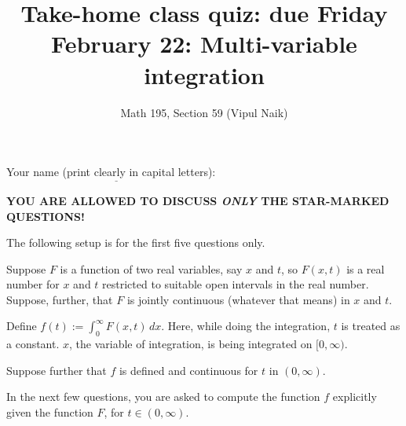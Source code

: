 \documentclass[10pt]{amsart}
\title{Take-home class quiz: due Friday February 22: Multi-variable integration}
\author{Math 195, Section 59 (Vipul Naik)}
\begin{document}
\maketitle

Your name (print clearly in capital letters): $\underline{\qquad\qquad\qquad\qquad\qquad\qquad\qquad\qquad\qquad\qquad}$

{\bf YOU ARE ALLOWED TO DISCUSS {\em ONLY} THE STAR-MARKED QUESTIONS!}

The following setup is for the first five questions only.

Suppose $F$ is a function of two real variables, say $x$
and $t$, so $F(x,t)$ is a real number for $x$ and $t$ restricted to
suitable open intervals in the real number. Suppose, further, that $F$
is jointly continuous (whatever that means) in $x$ and $t$.

Define $f(t) := \int_0^\infty F(x,t) \, dx$. Here, while doing the
integration, $t$ is treated as a constant. $x$, the variable of
integration, is being integrated on $[0,\infty)$.
  
Suppose further that $f$ is defined and continuous for $t$ in
$(0,\infty)$.

In the next few questions, you are asked to compute the function $f$
explicitly given the function $F$, for $t \in (0,\infty)$.
\end{document}
